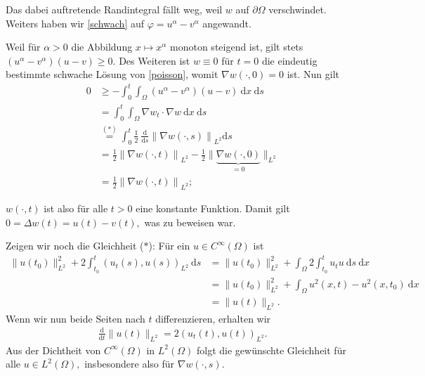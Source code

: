 \begin{solution}
Das dabei auftretende Randintegral fällt weg, weil $w$ auf $\partial\Omega$ verschwindet. Weiters haben wir \eqref{schwach} auf $\varphi = u^\alpha - v^\alpha$ angewandt.

Weil für $\alpha > 0$ die Abbildung $x \mapsto x^\alpha$ monoton steigend ist, gilt stets $(u^\alpha - v^\alpha) (u-v) \geq 0.$ Des Weiteren ist $w \equiv 0$ für $t = 0$ die eindeutig bestimmte schwache Lösung von \eqref{poisson}, womit $\nabla w(\cdot, 0) = 0$ ist. Nun gilt
\begin{align*}
    0 &\geq - \int_0^t \int_\Omega (u^\alpha - v^\alpha) (u-v) \mathrm{~d}x \mathrm{~d}s\\
    &= \int_0^t \int_\Omega \nabla w_t \cdot \nabla w \mathrm{~d}x \mathrm{~d}s\\
    &\stackrel{(\ast)}{=} \int_0^t \frac{1}{2} ~\frac{\mathrm{d}}{\mathrm{d}s} \left\| \nabla w(\cdot, s)\right\|_{L^2} \mathrm{d}s\\
    &= \frac{1}{2} \left\| \nabla w(\cdot, t)\right\|_{L^2} - \frac{1}{2} \| \underbrace{\nabla w(\cdot, 0)}_{=0}\|_{L^2}\\
    &= \frac{1}{2} \left\| \nabla w(\cdot, t)\right\|_{L^2};
\end{align*}

$w(\cdot, t)$ ist also für alle $t > 0$ eine konstante Funktion. Damit gilt $0 = \Delta w(t) = u(t) - v(t),$ was zu beweisen war.

Zeigen wir noch die Gleichheit ($\ast$): Für ein $u \in C^\infty(\Omega)$ ist
\begin{align*}
    \|u(t_0)\|^2_{L^2} + 2 \int_{t_0}^{t} (u_t(s), u(s))_{L^2} \mathrm{~d}s
    &= \|u(t_0)\|^2_{L^2} + \int_\Omega 2 \int_{t_0}^{t} u_t u \mathrm{~d}s \mathrm{~d}x\\
    &= \|u(t_0)\|^2_{L^2} + \int_\Omega u^2(x, t) - u^2(x, t_0) \mathrm{~d}x\\
    &= \| u(t)\|_{L^2}.
\end{align*}
Wenn wir nun beide Seiten nach $t$ differenzieren, erhalten wir
\begin{align*}
    \frac{\mathrm{d}}{\mathrm{d}t} \|u(t)\|_{L^2} = 2 \left(u_t(t), u(t)\right)_{L^2}.
\end{align*}
Aus der Dichtheit von $C^\infty(\Omega)$ in $L^2(\Omega)$ folgt die gewünschte Gleichheit für alle $u \in L^2(\Omega),$ insbesondere also für $\nabla w(\cdot, s).$
\end{solution}

